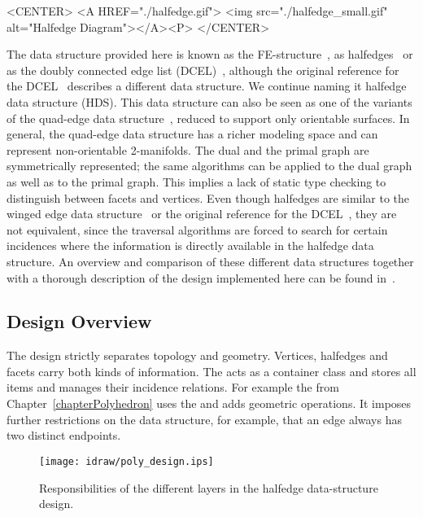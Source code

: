 \begin{ccHtmlOnly}
    <CENTER>
    <A HREF="./halfedge.gif">
        <img src="./halfedge_small.gif" alt="Halfedge Diagram"></A><P>
    </CENTER>
\end{ccHtmlOnly}

The data structure provided here is known as the
FE-structure~\cite{w-ebdss-85}, as
halfedges~\cite{m-ism-88,bfh-mgedm-95} or as the doubly connected edge
list (DCEL)~\cite{bkos-cgaa-97}, although the original reference for
the DCEL~\cite{mp-fitcp-78} describes a different data structure. We
continue naming it halfedge data structure (HDS). This data structure
can also be seen as one of the variants of the quad-edge data
structure~\cite{gs-pmgsc-85}, reduced to support only orientable
surfaces. In general, the quad-edge data structure has a richer
modeling space and can represent non-orientable 2-manifolds. The dual
and the primal graph are symmetrically represented; the same
algorithms can be applied to the dual graph as well as to the primal
graph. This implies a lack of static type checking to distinguish
between facets and vertices.  Even though halfedges are similar to the
winged edge data structure~\cite{b-prcv-75} or the original reference
for the DCEL~\cite{mp-fitcp-78}, they are not equivalent, since the
traversal algorithms are forced to search for certain incidences where
the information is directly available in the halfedge data structure.
An overview and comparison of these different data structures together
with a thorough description of the design implemented here can be
found in~\cite{k-ddsps-98}.


\subsection*{Design Overview}

The design strictly separates topology and geometry. Vertices,
halfedges and facets carry both kinds of information. The
 acts as a container class and stores all
items and manages their incidence relations. For example the
 from Chapter~\ref{chapterPolyhedron} uses the
 and adds geometric operations. It
imposes further restrictions on the data structure, for example, that
an edge always has two distinct endpoints.


\begin{ccTexOnly}
  \begin{figure}
    \begin{center}
      \parbox{0.7\textwidth}{%
          \texttt{[image: idraw/poly\_design.ips]}%
      }
    \end{center}
    \caption{Responsibilities of the different layers in the 
             halfedge data-structure design.}
    \label{figurePolyDesign}
  \end{figure}
\end{ccTexOnly}


